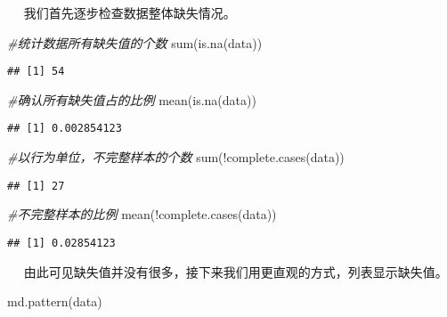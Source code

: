 \documentclass[
]{article}
\newenvironment{Shaded}{\begin{snugshade}}{\end{snugshade}}
\newcommand{\CommentTok}[1]{\textcolor[rgb]{0.56,0.35,0.01}{\textit{#1}}}
\newcommand{\FunctionTok}[1]{\textcolor[rgb]{0.00,0.00,0.00}{#1}}
\newcommand{\NormalTok}[1]{#1}
\newcommand{\SpecialCharTok}[1]{\textcolor[rgb]{0.00,0.00,0.00}{#1}}
\begin{document}
  我们首先逐步检查数据整体缺失情况。

\begin{Shaded}
\begin{Highlighting}[]
\CommentTok{\#统计数据所有缺失值的个数}
\FunctionTok{sum}\NormalTok{(}\FunctionTok{is.na}\NormalTok{(data))}
\end{Highlighting}
\end{Shaded}

\begin{verbatim}
## [1] 54
\end{verbatim}

\begin{Shaded}
\begin{Highlighting}[]
\CommentTok{\#确认所有缺失值占的比例}
\FunctionTok{mean}\NormalTok{(}\FunctionTok{is.na}\NormalTok{(data))}
\end{Highlighting}
\end{Shaded}

\begin{verbatim}
## [1] 0.002854123
\end{verbatim}

\begin{Shaded}
\begin{Highlighting}[]
\CommentTok{\#以行为单位，不完整样本的个数}
\FunctionTok{sum}\NormalTok{(}\SpecialCharTok{!}\FunctionTok{complete.cases}\NormalTok{(data))}
\end{Highlighting}
\end{Shaded}

\begin{verbatim}
## [1] 27
\end{verbatim}

\begin{Shaded}
\begin{Highlighting}[]
\CommentTok{\#不完整样本的比例}
\FunctionTok{mean}\NormalTok{(}\SpecialCharTok{!}\FunctionTok{complete.cases}\NormalTok{(data))}
\end{Highlighting}
\end{Shaded}

\begin{verbatim}
## [1] 0.02854123
\end{verbatim}

  由此可见缺失值并没有很多，接下来我们用更直观的方式，列表显示缺失值。

\begin{Shaded}
\begin{Highlighting}[]
\FunctionTok{md.pattern}\NormalTok{(data)}
\end{Highlighting}
\end{Shaded}
\end{document}
